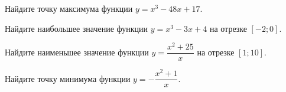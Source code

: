 \begin{consultation}
	\begin{listofex}
		\item Найдите точку максимума функции \(y=x^3-48x+17\).
		\item Найдите наибольшее значение функции \(y=x^3-3x+4\) на отрезке \([-2;0]\).
		\item Найдите наименьшее значение функции \(y=\dfrac{ x^2+25 }{ x }\) на отрезке \([1;10]\).
		\item Найдите точку минимума функции \(y=-\dfrac{ x^2+1 }{ x }\).
		

\end{listofex}
\end{consultation}
